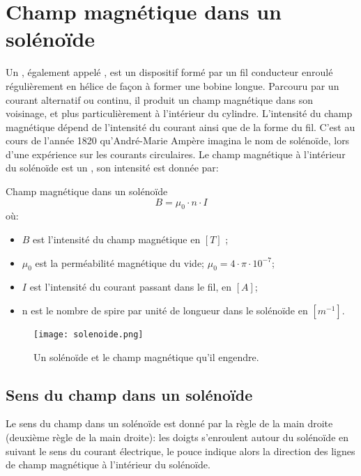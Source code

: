 \section{Champ magnétique dans un solénoïde}
Un , également appelé , est un dispositif formé par un fil conducteur enroulé  régulièrement en hélice de façon à former une bobine longue. Parcouru par un courant alternatif ou continu, il produit un champ magnétique dans son voisinage, et plus particulièrement à l'intérieur du cylindre. L'intensité du champ magnétique dépend de l'intensité du courant ainsi que de la forme du fil. C'est au cours de l'année 1820 qu'André-Marie Ampère imagina le nom de solénoïde, lors d'une expérience sur les courants circulaires.
Le champ magnétique à l'intérieur du solénoïde est un , son intensité est donnée par:
\begin{encadre_equation*}{Champ magnétique dans un solénoïde}
    \begin{equation}
        B =\mu_0 \cdot n \cdot I
    \end{equation}
    où:
    \begin{itemize}[label=\textbullet]
        \item \(B\) est l'intensité du champ magnétique en \([T]\) ;
        \item \(\mu_0\) est la perméabilité magnétique du vide; \(\mu_0=4 \cdot \pi \cdot 10^{-7}\);
        \item \(I\) est l'intensité du courant passant dans le fil, en \([A]\);
        \item n est le nombre de spire par unité de longueur dans le solénoïde en \([m^{-1}]\).
    \end{itemize}
\end{encadre_equation*}

\begin{figure}[h]
    \centering
    \texttt{[image: solenoide.png]}
    \caption{Un solénoïde et le champ magnétique qu'il engendre.}
    \label{solenoide}
\end{figure}

\newpage

\subsection{Sens du champ dans un solénoïde}
Le sens du champ dans un solénoïde est donné par la règle de la main droite (deuxième règle de la main droite): les doigts s'enroulent autour du solénoïde en suivant le sens du courant électrique, le pouce indique alors la direction des lignes de champ magnétique à l'intérieur du solénoïde.

